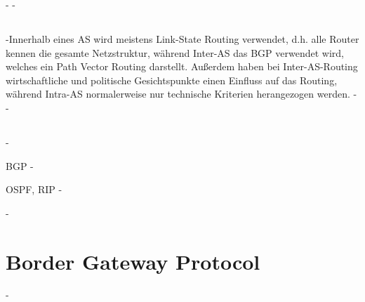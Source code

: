 \documentclass[a4paper,
			llpt,
			solution,
			accentcolor=tud2d,
			colorbacktitle
			]
			{tudexercise}
\newcommand{\8}{$\infty$}
\begin{document}
-
-\subsection{}
-Innerhalb eines AS wird meistens Link-State Routing verwendet, d.h. alle Router kennen die gesamte Netzstruktur, während Inter-AS das BGP verwendet wird, welches ein Path Vector Routing darstellt. Außerdem haben bei Inter-AS-Routing wirtschaftliche und politische Gesichtspunkte einen Einfluss auf das Routing, während Intra-AS normalerweise nur technische Kriterien herangezogen werden.
-
-\subsection{}\begin{compactenum}
-\item BGP
-\item OSPF, RIP
-\end{compactenum}
-\section{Border Gateway Protocol}
-\subsection{}
\end{document}
